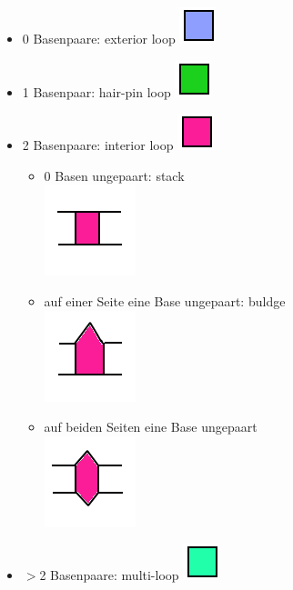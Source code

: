 \begin{itemize}
	\item 0 Basenpaare: exterior loop
	\includegraphics[scale=0.4]{lectures/160404_2/pix/turner0}
	\item 1 Basenpaar: hair-pin loop
	\includegraphics[scale=0.4]{lectures/160404_2/pix/turner1}
	\item 2 Basenpaare: interior loop
	\includegraphics[scale=0.4]{lectures/160404_2/pix/turner2}
	
	\begin{itemize}
	\item 0 Basen ungepaart: stack\\
	\includegraphics[scale=0.4]{lectures/160404_2/pix/stack}\\
	\item auf einer Seite eine Base ungepaart: buldge\\
	\includegraphics[scale=0.4]{lectures/160404_2/pix/buldge1}\\
	\item auf beiden Seiten eine Base ungepaart\\
	\includegraphics[scale=0.4]{lectures/160404_2/pix/buldge2}\\
	\end{itemize}
	
	\item $>$2 Basenpaare:  multi-loop
	\includegraphics[scale=0.4]{lectures/160404_2/pix/turner3}
\end{itemize}

